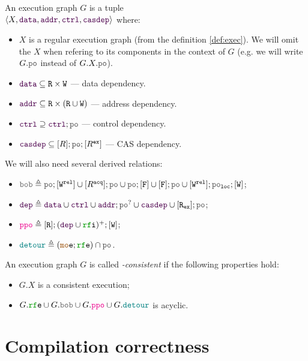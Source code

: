 \documentclass[12pt]{article}
\begin{document}
\begin{definition}
  An \imm execution graph $G$ is a tuple \\
  $\tup{X, \lDATA, \lADDR, \lCTRL, \lCASDEP}$ where:
  \begin{itemize}
    \item $X$ is a regular execution graph (from the definition \ref{def:exec}).
      We will omit the $X$ when refering to its components in the context of $G$
      (e.g. we will write $G.\lPO$ instead of $G.X.\lPO$).
    \item $\lDATA \subseteq \lR \times \lW$ --- data dependency.
    \item $\lADDR \subseteq \lR \times (\lR \cup \lW)$ --- address dependency.
    \item $\lCTRL \supseteq \lCTRL; \lPO$ --- control dependency.
    \item $\lCASDEP \subseteq [R];\lPO;[R^{\Ex}]$ --- CAS dependency.
  \end{itemize}

  We will also need several derived relations:
  \begin{itemize}
    \item $\lBOB \defeq
      \lPO;[\lW^{\rel}] \cup [R^{\acq}];\lPO \cup \lPO;[\lF] \cup [\lF];\lPO \cup [\lW^{\rel}];\lPO_{\lLOC};[\lW]$;
    \item $\lDEPS \defeq \lDATA \cup \lCTRL \cup \lADDR;\lPO^? \cup \lCASDEP \cup [\lR_{\Ex}];\lPO$;
    \item $\lPPO \defeq [\lR];(\lDEPS \cup \lRFI)^+;[\lW]$;
    \item $\lDETOUR \defeq (\lMOE;\lRFE) \cap \lPO$.
  \end{itemize}

\end{definition}

\begin{definition}
  An \imm execution graph $G$ is called \emph{\imm-consistent} if the following properties hold:
  \begin{itemize}
    \item $G.X$ is a consistent execution;
    \item $G.\lRFE \cup G.\lBOB \cup G.\lPPO \cup G.\lDETOUR$ is acyclic.
  \end{itemize}
\end{definition}

\section{Compilation correctness}
\end{document}
